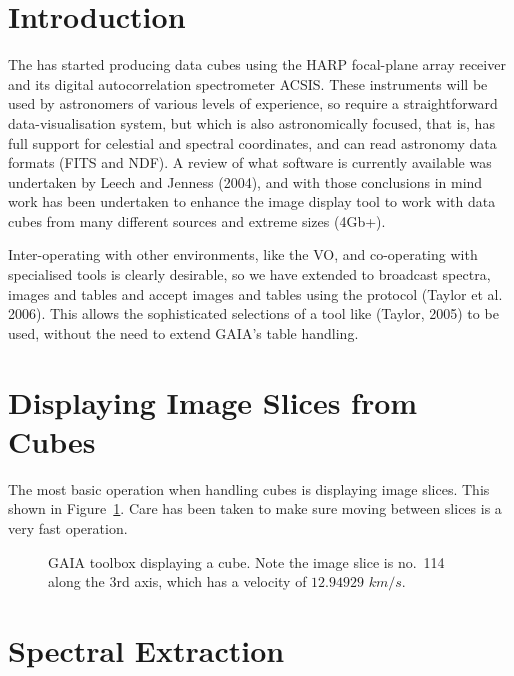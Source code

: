 \documentclass[11pt,twoside]{article}  %
\begin{document}
\section{Introduction}

The  has started producing
data cubes using the HARP focal-plane array receiver and its digital
autocorrelation spectrometer ACSIS. These instruments will be used by
astronomers of various levels of experience, so require a straight\-forward
data-visualisation system, but which is also astronomically focused, that is,
has full support for celestial and spectral coordinates, and can read
astronomy data formats (FITS and NDF). A review of what software is currently
available was undertaken by Leech and Jenness (2004), and with those
conclusions in mind work has been undertaken to enhance the
image display tool to work with data cubes from many different sources and
extreme sizes (4Gb+).

Inter-operating with other environments, like the VO, and co-operating with
specialised tools is clearly desirable, so we have extended 
to broadcast spectra, images and tables and accept images and tables using the
protocol (Taylor et al. 2006). This allows the sophisticated selections of a
tool like
(Taylor, 2005) to be used, without the need to extend GAIA's
table handling.

\section{Displaying Image Slices from Cubes}

The most basic operation when handling cubes is displaying image slices. This
shown in Figure~\ref{D1.1-fig1}. Care has been taken to make sure moving
between slices is a very fast operation.

\begin{figure}
\caption{GAIA toolbox displaying a cube. Note the image slice is no.\ 114
along the 3rd axis, which has a velocity of $12.94929$ $km/s$.
}
\label{D1.1-fig1}
\end{figure}

\section{Spectral Extraction}
\end{document}
